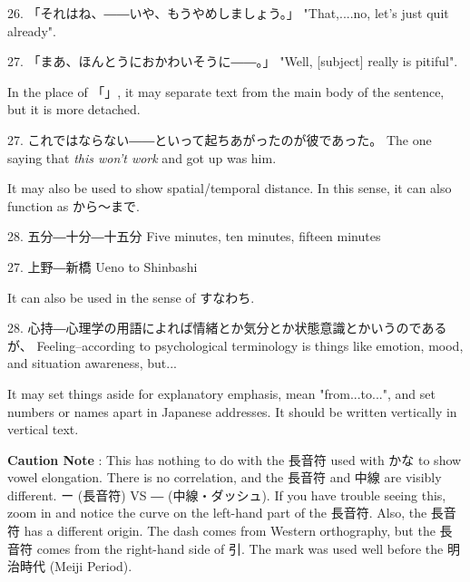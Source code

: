 \par{26. 「それはね、――いや、もうやめしましょう。」 \hfill\break
"That,\dothyp{}\dothyp{}\dothyp{}.no, let's just quit already". }

\par{27. 「まあ、ほんとうにおかわいそうに――。」 \hfill\break
"Well, [subject] really is pitiful". }

\par{ In the place of 「」, it may separate text from the main body of the sentence, but it is more detached. }

\par{27. これではならない――といって起ちあがったのが彼であった。 \hfill\break
The one saying that \emph{this won't work }and got up was him. }

\par{ It may also be used to show spatial\slash temporal distance. In this sense, it can also function as から～まで. }

\par{28. 五分―十分―十五分 \hfill\break
Five minutes, ten minutes, fifteen minutes }

\par{27. 上野―新橋 \hfill\break
Ueno to Shinbashi }

\par{ It can also be used in the sense of すなわち. }

\par{28. 心持―心理学の用語によれば情緒とか気分とか状態意識とかいうのであるが、 \hfill\break
Feeling--according to psychological terminology is things like emotion, mood, and situation awareness, but\dothyp{}\dothyp{}\dothyp{} }

\par{It may set things aside for explanatory emphasis, mean "from\dothyp{}\dothyp{}\dothyp{}to\dothyp{}\dothyp{}\dothyp{}", and set numbers or names apart in Japanese addresses. It should be written vertically in vertical text. }

\par{\textbf{Caution Note }: This has nothing to do with the 長音符 used with かな to show vowel elongation. There is no correlation, and the 長音符 and 中線 are visibly different. ー (長音符) VS ― (中線・ダッシュ). If you have trouble seeing this, zoom in and notice the curve on the left-hand part of the 長音符. Also, the 長音符 has a different origin. The dash comes from Western orthography, but the 長音符 comes from the right-hand side of 引. The mark was used well before the 明治時代 (Meiji Period). }
      
